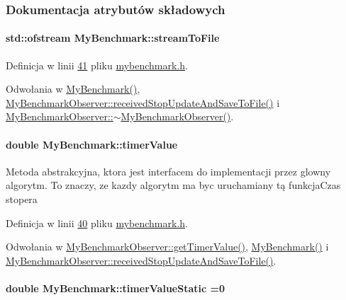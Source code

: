 \subsubsection{Dokumentacja atrybutów składowych}
\hypertarget{class_my_benchmark_a45b39f704800f8403789ff5c9bbb486b}{
\paragraph[{stream\-To\-File}]{\setlength{\rightskip}{0pt plus 5cm}std\-::ofstream My\-Benchmark\-::stream\-To\-File}}\label{class_my_benchmark_a45b39f704800f8403789ff5c9bbb486b}


Definicja w linii \hyperlink{mybenchmark_8h_source_l00041}{41} pliku \hyperlink{mybenchmark_8h_source}{mybenchmark.\-h}.



Odwołania w \hyperlink{mybenchmark_8h_source_l00043}{My\-Benchmark()}, \hyperlink{mybenchmark_8h_source_l00086}{My\-Benchmark\-Observer\-::received\-Stop\-Update\-And\-Save\-To\-File()} i \hyperlink{mybenchmark_8h_source_l00092}{My\-Benchmark\-Observer\-::$\sim$\-My\-Benchmark\-Observer()}.

\hypertarget{class_my_benchmark_a1cdab837ead670bd438f249ee82c8eff}{
\paragraph[{timer\-Value}]{\setlength{\rightskip}{0pt plus 5cm}double My\-Benchmark\-::timer\-Value}}\label{class_my_benchmark_a1cdab837ead670bd438f249ee82c8eff}
Metoda abstrakcyjna, ktora jest interfacem do implementacji przez glowny algorytm. To znaczy, ze kazdy algorytm ma byc uruchamiany tą funkcja\-Czas stopera 

Definicja w linii \hyperlink{mybenchmark_8h_source_l00040}{40} pliku \hyperlink{mybenchmark_8h_source}{mybenchmark.\-h}.



Odwołania w \hyperlink{mybenchmark_8h_source_l00076}{My\-Benchmark\-Observer\-::get\-Timer\-Value()}, \hyperlink{mybenchmark_8h_source_l00043}{My\-Benchmark()} i \hyperlink{mybenchmark_8h_source_l00086}{My\-Benchmark\-Observer\-::received\-Stop\-Update\-And\-Save\-To\-File()}.

\hypertarget{class_my_benchmark_aeca64d5b265e357ef879bf982dd4bb00}{
\paragraph[{timer\-Value\-Static}]{\setlength{\rightskip}{0pt plus 5cm}double My\-Benchmark\-::timer\-Value\-Static =0\hspace{0.3cm}{\ttfamily [static]}}}\label{class_my_benchmark_aeca64d5b265e357ef879bf982dd4bb00}


